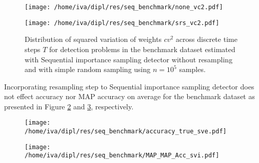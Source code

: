 \documentclass[times, utf8, diplomski]{fer}
\begin{document}
\begin{figure}[H]
\center
\begin{minipage}{\textwidth}
\center
\texttt{[image: /home/iva/dipl/res/seq\_benchmark/none\_vc2.pdf]}
\end{minipage}
\begin{minipage}{\textwidth}
\center
\texttt{[image: /home/iva/dipl/res/seq\_benchmark/srs\_vc2.pdf]}
\end{minipage}
\caption{Distribution of squared variation of weights $cv^2$ across discrete time steps $T$ for detection problems in the benchmark dataset estimated with Sequential importance sampling detector  without resampling and with simple random sampling using $n=10^5$ samples. 
} 
\label{vc2_distr}
\end{figure}



Incorporating resampling step to Sequential importance sampling detector does not effect accuracy nor MAP accuracy on average for the benchmark dataset as presented in Figure \ref{accuracy_true} and  \ref{map_map_acc}, respectively. 

\begin{figure}[H]
\begin{minipage}{\linewidth}
\texttt{[image: /home/iva/dipl/res/seq\_benchmark/accuracy\_true\_sve.pdf]}
\label{accuracy_true}
\end{minipage}
\end{figure}

\begin{figure}[H]
\begin{minipage}{\linewidth}
\texttt{[image: /home/iva/dipl/res/seq\_benchmark/MAP\_MAP\_Acc\_svi.pdf]}
\label{map_map_acc}
\end{minipage}
\end{figure}
\end{document}
